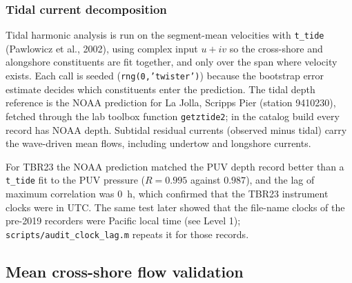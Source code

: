 
\subsubsection{Tidal current decomposition}

Tidal harmonic analysis is run on the segment-mean velocities with
\texttt{t\_tide} (Pawlowicz et al., 2002), using complex input $u + iv$ so the
cross-shore and alongshore constituents are fit together, and only over the span
where velocity exists. Each call is seeded (\texttt{rng(0,'twister')}) because the
bootstrap error estimate decides which constituents enter the prediction. The
tidal depth reference is the NOAA prediction for La Jolla, Scripps Pier (station
9410230), fetched through the lab toolbox function \texttt{getztide2}; in the
catalog build every record has NOAA depth. Subtidal residual currents (observed
minus tidal) carry the wave-driven mean flows, including undertow and longshore
currents.

For TBR23 the NOAA prediction matched the PUV depth record better than a
\texttt{t\_tide} fit to the PUV pressure ($R = 0.995$ against $0.987$), and the
lag of maximum correlation was 0~h, which confirmed that the TBR23 instrument
clocks were in UTC. The same test later showed that the file-name clocks of the
pre-2019 recorders were Pacific local time (see Level 1);
\texttt{scripts/audit\_clock\_lag.m} repeats it for those records.


\subsection{Mean cross-shore flow validation}
\label{sec:mean_flow_validation}

